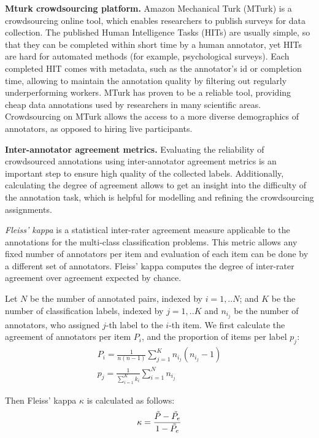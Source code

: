 \documentclass[11pt, oneside]{book}
\newcommand{\paragraphHd}[1] {\vspace{3pt}\noindent\textbf{#1}}
\begin{document}
\paragraphHd{Mturk crowdsourcing platform.} Amazon Mechanical Turk (MTurk) is a crowdsourcing online tool, which enables researchers to publish surveys for data collection. The published Human Intelligence Tasks (HITs) are usually simple, so that they can be completed within short time by a human annotator, yet HITs are hard for automated methods (for example, psychological surveys). Each completed HIT comes with metadata, such as the annotator's id or completion time, allowing to maintain the annotation quality by filtering out regularly underperforming workers. MTurk has proven to be a reliable tool, providing cheap data annotations \cite{peer2017beyond} used by researchers in many scientific areas. Crowdsourcing on MTurk allows the access to a more diverse demographics of annotators, as opposed to hiring live participants.

\paragraphHd{Inter-annotator agreement metrics.} Evaluating the reliability of crowdsourced annotations using inter-annotator agreement metrics
is an important step to ensure high quality of the collected labels. Additionally, calculating the degree of agreement allows to get an insight into the difficulty of the annotation task, which is helpful for modelling and refining the crowdsourcing assignments.

\textit{Fleiss' kappa} \cite{fleiss1971measuring} is a statistical inter-rater agreement measure applicable to the annotations for the multi-class classification problems. This metric allows any fixed number of annotators per item and evaluation of each item can be done by a different set of annotators. Fleiss' kappa computes the degree of inter-rater agreement over agreement expected by chance.

Let $N$ be the number of annotated pairs, indexed by $i=1,..N$; and $K$ be the number of classification labels, indexed by $j=1,..K$ and $n_i_j$ be the number of annotators, who assigned $j$-th label to the $i$-th item. We first calculate the agreement of annotators per item $P_i$, and the proportion of items per label $p_j$:
\begin{align}
    P_i = \frac{1}{n (n-1)} \sum_{j=1}^K n_i_j(n_i_j - 1) \\  
    p_j = \frac{1}{\sum_{i=1}^K k_i} \sum_{i=1}^N n_i_j
\end{align}

Then Fleiss' kappa $\kappa$ is calculated as follows:
\begin{align}
    \kappa = \frac{\Tilde{P} - \Tilde{P_e}}{1 - \Tilde{P_e}}
    \label{eq1}
\end{align}
\end{document}
